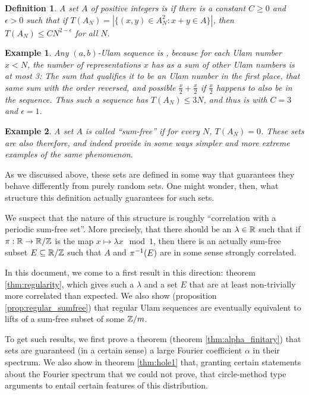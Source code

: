 \documentclass{report}
\newtheorem{definition}[theorem]{Definition}
\newtheorem{example}{Example}
\theoremstyle{remark}
\numberwithin{equation}{section}
\begin{document}
\begin{definition}A set $A$ of positive integers is
  \textbf{\relevant}if there is a constant $C \geq 0$ and $\epsilon > 0$
  such that if $T(A_N) = |\{(x, y)\in A_N^2 : x + y \in A\}|$, then
  $T(A_N) \leq C N^{2-\epsilon}$ for all $N$.  
\end{definition}

\begin{example}
  Any $(a,b)$-Ulam sequence is \relevant, because for each Ulam number
  $x < N$, the number of representations $x$ has as a sum of other
  Ulam numbers is at most 3: The sum that qualifies it to be an Ulam
  number in the first place, that same sum with the order reversed,
  and possible $\frac{x}{2} + \frac{x}{2}$ if $\frac{x}{2}$ happens to
  also be in the sequence.  Thus such a sequence has $T(A_N) \leq 3N$,
  and thus is \relevant with $C = 3$ and $\epsilon = 1$.
\end{example}

\begin{example}
  A set $A$ is called ``sum-free'' if for every $N$, $T(A_N) = 0$.
  These sets are also \relevant therefore, and indeed provide in some
  ways simpler and more extreme examples of the same phenomenon.  
\end{example}

As we discussed above, these sets are defined in some way that
guarantees they behave differently from purely random sets.  One might
wonder, then, what structure this definition actually guarantees for
such sets.

We suspect that the nature of this structure is roughly ``correlation
with a periodic sum-free set''.  More precisely, that there should be
an $\lambda \in \mathbb{R}$ such that if $\pi : \mathbb{R} \to \mathbb{R}/\mathbb{Z}$ is the map
$x \mapsto \lambda x\mod{1}$, then there is an actually sum-free
subset $E \subseteq \mathbb{R}/\mathbb{Z}$ such that $A$ and $\pi^{-1}(E)$ are in some
sense strongly correlated.  

In this document, we come to a first result in this direction: theorem
\ref{thm:regularity}, which gives such a $\lambda$ and a set $E$ that
are at least non-trivially more correlated than expected.  We also
show (proposition \ref{prop:regular_sumfree}) that regular Ulam
sequences are eventually equivalent to lifts of a sum-free subset of
some $\mathbb{Z}/m$.  

To get such results, we first prove a theorem (theorem
\ref{thm:alpha_finitary}) that \relevant sets are guaranteed (in a
certain sense) a large Fourier coefficient $\alpha$ in their spectrum.
We also show in theorem \ref{thm:hole1} that, granting certain
statements about the Fourier spectrum that we could not prove, that
circle-method type arguments to entail certain features of this
distribution.  
\end{document}
